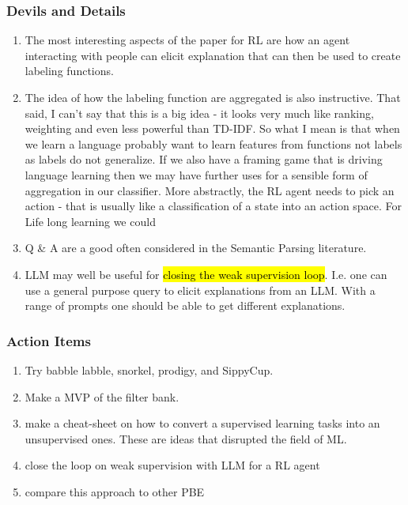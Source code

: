 \documentclass[
  letterpaper,
  DIV=11,
  numbers=noendperiod,
  oneside]{scrartcl}
\providecommand{\tightlist}{%
  \setlength{\itemsep}{0pt}\setlength{\parskip}{0pt}}
\begin{document}
\begin{tcolorbox}
\subsubsection{Devils and Details}\label{devils-and-details}

\begin{enumerate}
\def\labelenumi{\arabic{enumi}.}
\tightlist
\item
  The most interesting aspects of the paper for RL are how an agent
  interacting with people can elicit explanation that can then be used
  to create labeling functions.
\item
  The idea of how the labeling function are aggregated is also
  instructive. That said, I can't say that this is a big idea - it looks
  very much like ranking, weighting and even less powerful than TD-IDF.
  So what I mean is that when we learn a language probably want to learn
  features from functions not labels as labels do not generalize. If we
  also have a framing game that is driving language learning then we may
  have further uses for a sensible form of aggregation in our
  classifier. More abstractly, the RL agent needs to pick an action -
  that is usually like a classification of a state into an action space.
  For Life long learning we could
\item
  Q \& A are a good often considered in the Semantic Parsing literature.
\item
  LLM may well be useful for \hl{closing the weak supervision loop}.
  I.e. one can use a general purpose query to elicit explanations from
  an LLM. With a range of prompts one should be able to get different
  explanations.
\end{enumerate}

\subsubsection{Action Items}\label{action-items}

\begin{enumerate}
\def\labelenumi{\arabic{enumi}.}
\tightlist
\item
  Try babble labble, snorkel, prodigy, and SippyCup.
\item
  Make a MVP of the filter bank.
\item
  make a cheat-sheet on how to convert a supervised learning tasks into
  an unsupervised ones. These are ideas that disrupted the field of ML.
\item
  close the loop on weak supervision with LLM for a RL agent
\item
  compare this approach to other PBE
\end{enumerate}

\end{tcolorbox}
\end{document}
